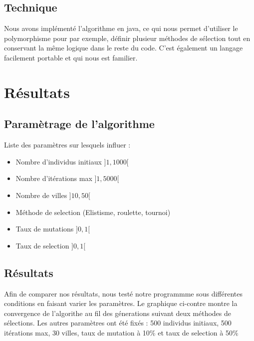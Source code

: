 \documentclass{article}
\begin{document}
	\subsection{Technique}
	Nous avons implémenté l'algorithme en java, ce qui nous permet d'utiliser le polymorphisme pour par exemple, définir plusieur méthodes de sélection tout en conservant la même logique dans le reste du code. C'est également un langage facilement portable et qui nous est familier.

\section{Résultats}
	\subsection{Paramètrage de l'algorithme}

	Liste des paramètres sur lesquels influer :
	\begin{itemize}
	\item Nombre d'individus initiaux $]1,1000[$
	\item Nombre d'itérations max $]1,5000[$
	\item Nombre de villes $]10,50[$
	\item Méthode de selection (Elistisme, roulette, tournoi)
	\item Taux de mutations $]0,1[$
	\item Taux de selection $]0,1[$
	\end{itemize}

	\subsection{Résultats}

    Afin de comparer nos résultats, nous testé notre programmme sous différentes conditions en faisant varier les paramètres.
    Le graphique ci-contre montre la convergence de l'algorithe au fil des génerations suivant deux méthodes de sélections.
    Les autres paramètres ont été fixés : 500 individus initiaux, 500 itérations max, 30 villes, taux de mutation à 10\% et taux de selection à 50\%
	\begin{figure}[!h]
		\begin{center}
		\end{center}
	\end{figure}
\end{document}
